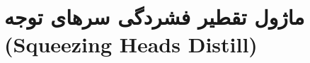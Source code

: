 \section{ماژول تقطیر فشردگی سرهای توجه (Squeezing Heads Distill)}
\label{sec:module_squeezing_heads_distill}
